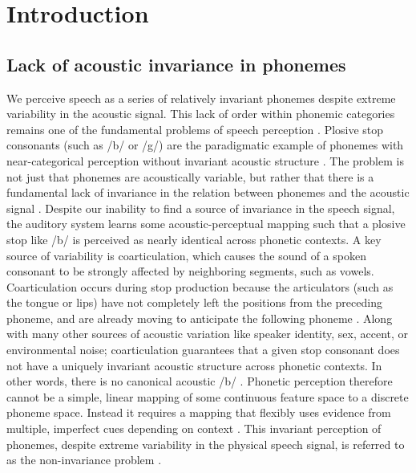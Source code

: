 \documentclass[11pt]{article}\usepackage[]{graphicx}\usepackage[]{color}
\begin{document}
%
%
%
\section{Introduction}
\subsection{Lack of acoustic invariance in phonemes}

We perceive speech as a series of relatively invariant phonemes despite extreme variability in the acoustic signal. This lack of order within phonemic categories remains one of the fundamental problems of speech perception \cite{Sussman1998}. Plosive stop consonants (such as /b/ or /g/) are the paradigmatic example of phonemes with near-categorical perception \cite{Holt2010,Kronrod2016a,LIBERMAN1957} without invariant acoustic structure \cite{Elman1988,Kluender1987}. The problem is not just that phonemes are acoustically variable, but rather that there is a fundamental lack of invariance in the relation between phonemes and the acoustic signal \cite{Kluender1987}. Despite our inability to find a source of invariance in the speech signal, the auditory system learns some acoustic-perceptual mapping such that a plosive stop like /b/ is perceived as nearly identical across phonetic contexts. A key source of variability is coarticulation, which causes the sound of a spoken consonant to be strongly affected by neighboring segments, such as vowels. Coarticulation occurs during stop production because the articulators (such as the tongue or lips) have not completely left the positions from the preceding phoneme, and are already moving to anticipate the following phoneme \cite{Liberman1967,Farnetani1990}.  Along with many other sources of acoustic variation like speaker identity, sex, accent, or environmental noise; coarticulation guarantees that a given stop consonant does not have a uniquely invariant acoustic structure across phonetic contexts. In other words, there is no canonical acoustic /b/ \cite{Liberman1967,Holt2010}. Phonetic perception therefore cannot be a simple, linear mapping of some continuous feature space to a discrete phoneme space. Instead it requires a mapping that flexibly uses evidence from multiple, imperfect cues depending on context \cite{Holt2010, Diehl2004}. This invariant perception of phonemes, despite extreme variability in the physical speech signal, is referred to as the non-invariance problem \cite{Perkell1986}.
\end{document}
